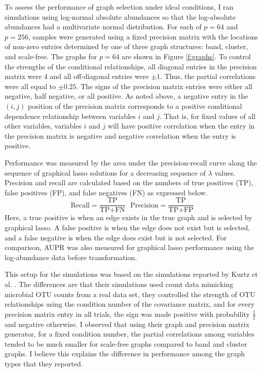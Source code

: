 \documentclass[10pt]{article}
\begin{document}
To assess the performance of graph selection under ideal conditions, I ran simulations using log-normal absolute abundances so that the log-absolute abundances had a multivariate normal distribution. For each of $p = 64$ and $p = 256$, samples were generated using a fixed precision matrix with the locations of non-zero entries determined by one of three graph structures: band, cluster, and scale-free. The graphs for $p = 64$ are shown in Figure \ref{f:graphs}. To control the strengths of the conditional relationships, all diagonal entries in the precision matrix were 4 and all off-diagonal entries were $\pm 1$. Thus, the partial correlations were all equal to $\pm 0.25$. The signs of the precision matrix entries were either all negative, half negative, or all positive. As noted above, a negative entry in the $(i,j)$ position of the precision matrix corresponds to a positive conditional dependence relationship between variables $i$ and $j$. That is, for fixed values of all other variables, variables $i$ and $j$ will have positive correlation when the entry in the precision matrix is negative and negative correlation when the entry is positive.

Performance was measured by the area under the precision-recall curve along the sequence of graphical lasso solutions for a decreasing sequence of $\lambda$ values. Precision and recall are calculated based on the numbers of true positives (TP), false positives (FP), and false negatives (FN) as expressed below.
\begin{equation}
\text{Recall} = \frac{\text{TP}}{\text{TP}+\text{FN}}\ \ \ \text{Precision} = \frac{\text{TP}}{\text{TP}+\text{FP}}
\end{equation}
Here, a true positive is when an edge exists in the true graph and is selected by graphical lasso. A false positive is when the edge does not exist but is selected, and a false negative is when the edge does exist but is not selected. For comparison, AUPR was also measured for graphical lasso performance using the log-abundance data before transformation.

This setup for the simulations was based on the simulations reported by Kurtz et al. \citeyear{kurtz}. The differences are that their simulations used count data mimicking microbial OTU counts from a real data set, they controlled the strength of OTU relationships using the condition number of the covariance matrix, and for every precision matrix entry in all trials, the sign was made positive with probability $\frac{1}{2}$ and negative otherwise. I observed that using their graph and precision matrix generator, for a fixed condition number, the partial correlations among variables tended to be much smaller for scale-free graphs compared to band and cluster graphs. I believe this explains the difference in performance among the graph types that they reported.
\end{document}
